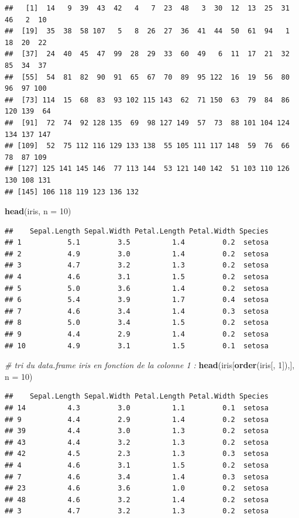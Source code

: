 \documentclass[
]{book}
\newenvironment{Shaded}{\begin{snugshade}}{\end{snugshade}}
\newcommand{\CommentTok}[1]{\textcolor[rgb]{0.56,0.35,0.01}{\textit{#1}}}
\newcommand{\DataTypeTok}[1]{\textcolor[rgb]{0.13,0.29,0.53}{#1}}
\newcommand{\DecValTok}[1]{\textcolor[rgb]{0.00,0.00,0.81}{#1}}
\newcommand{\KeywordTok}[1]{\textcolor[rgb]{0.13,0.29,0.53}{\textbf{#1}}}
\newcommand{\NormalTok}[1]{#1}
\begin{document}
\begin{verbatim}
##   [1]  14   9  39  43  42   4   7  23  48   3  30  12  13  25  31  46   2  10
##  [19]  35  38  58 107   5   8  26  27  36  41  44  50  61  94   1  18  20  22
##  [37]  24  40  45  47  99  28  29  33  60  49   6  11  17  21  32  85  34  37
##  [55]  54  81  82  90  91  65  67  70  89  95 122  16  19  56  80  96  97 100
##  [73] 114  15  68  83  93 102 115 143  62  71 150  63  79  84  86 120 139  64
##  [91]  72  74  92 128 135  69  98 127 149  57  73  88 101 104 124 134 137 147
## [109]  52  75 112 116 129 133 138  55 105 111 117 148  59  76  66  78  87 109
## [127] 125 141 145 146  77 113 144  53 121 140 142  51 103 110 126 130 108 131
## [145] 106 118 119 123 136 132
\end{verbatim}

\begin{Shaded}
\begin{Highlighting}[]
\KeywordTok{head}\NormalTok{(iris, }\DataTypeTok{n =} \DecValTok{10}\NormalTok{)}
\end{Highlighting}
\end{Shaded}

\begin{verbatim}
##    Sepal.Length Sepal.Width Petal.Length Petal.Width Species
## 1           5.1         3.5          1.4         0.2  setosa
## 2           4.9         3.0          1.4         0.2  setosa
## 3           4.7         3.2          1.3         0.2  setosa
## 4           4.6         3.1          1.5         0.2  setosa
## 5           5.0         3.6          1.4         0.2  setosa
## 6           5.4         3.9          1.7         0.4  setosa
## 7           4.6         3.4          1.4         0.3  setosa
## 8           5.0         3.4          1.5         0.2  setosa
## 9           4.4         2.9          1.4         0.2  setosa
## 10          4.9         3.1          1.5         0.1  setosa
\end{verbatim}

\begin{Shaded}
\begin{Highlighting}[]
\CommentTok{# tri du data.frame iris en fonction de la colonne 1 :}
\KeywordTok{head}\NormalTok{(iris[}\KeywordTok{order}\NormalTok{(iris[, }\DecValTok{1}\NormalTok{]),], }\DataTypeTok{n =} \DecValTok{10}\NormalTok{)}
\end{Highlighting}
\end{Shaded}

\begin{verbatim}
##    Sepal.Length Sepal.Width Petal.Length Petal.Width Species
## 14          4.3         3.0          1.1         0.1  setosa
## 9           4.4         2.9          1.4         0.2  setosa
## 39          4.4         3.0          1.3         0.2  setosa
## 43          4.4         3.2          1.3         0.2  setosa
## 42          4.5         2.3          1.3         0.3  setosa
## 4           4.6         3.1          1.5         0.2  setosa
## 7           4.6         3.4          1.4         0.3  setosa
## 23          4.6         3.6          1.0         0.2  setosa
## 48          4.6         3.2          1.4         0.2  setosa
## 3           4.7         3.2          1.3         0.2  setosa
\end{verbatim}
\end{document}
